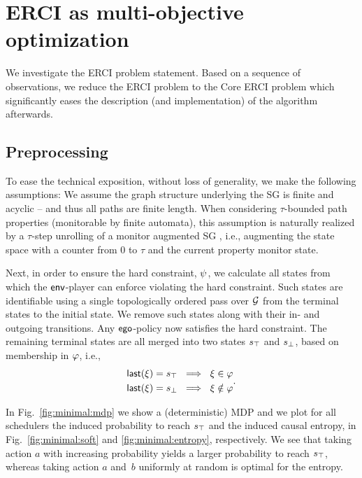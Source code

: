 \section{ERCI as multi-objective optimization}\label{sec:convex}
We investigate the ERCI problem statement. Based on a sequence of observations, we reduce the ERCI problem to the Core ERCI problem which significantly eases the description (and implementation) of the algorithm afterwards.

\subsection{Preprocessing}
To ease the technical exposition, without loss of generality, we make
the following assumptions:
We assume the graph
structure underlying the SG is finite and acyclic -- and thus all paths
are finite length. When considering $\tau$-bounded path properties (monitorable by finite automata),
this assumption is naturally realized by a $\tau$-step unrolling of a
monitor augmented SG \footnotemark, i.e., augmenting the state space with a counter from $0$ to $\tau$ and the current property monitor state. 


Next, in order to ensure the hard constraint, $\psi$, we
calculate all states from which the $\mathsf{env}$-player can enforce
violating the hard constraint. Such states are identifiable using a single
topologically ordered pass over $\mathcal{G}$ from the terminal states to the initial state.  We remove
such states along with their in- and outgoing transitions. Any
$\mathsf{ego}$-policy now satisfies the hard constraint. 
The remaining terminal states are all merged into two states $s_{\top}$ and
$s_{\bot}$, based on membership in $\varphi$, i.e.,
\begin{equation}
  \begin{split}
    \mathsf{last}({\xi}) = s_{\top} ~\implies~ \xi \in \varphi\\
    \mathsf{last}({\xi}) = s_{\bot} ~\implies~ \xi \notin \varphi
  \end{split}.
\end{equation}

\begin{example}
	In Fig.~\ref{fig:minimal:mdp} we show a (deterministic) MDP and we plot for all schedulers the induced probability to reach $s_{\top}$ and the induced causal entropy, in Fig.~\ref{fig:minimal:soft} and \ref{fig:minimal:entropy}, respectively. 
	We see that taking action $a$ with increasing probability yields a larger probability to reach $s_{\top}$, whereas taking action $a$ and~$b$ uniformly at random is optimal for the entropy. 
\end{example}


